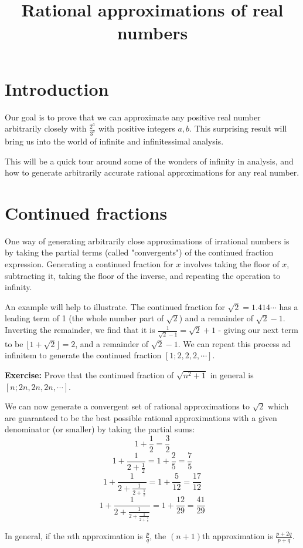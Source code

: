 \documentclass{article}
\begin{document}
\title{Rational approximations of real numbers}

\section{Introduction}

Our goal is to prove that we can approximate any positive real number arbitrarily closely
with $\frac{2^a}{3^b}$ with positive integers $a,b$. This surprising result will bring us
into the world of infinite and infinitessimal analysis.

This will be a quick tour around some of the wonders of infinity in analysis, and how to
generate arbitrarily accurate rational approximations for any real number.

\section{Continued fractions}

One way of generating arbitrarily close approximations of irrational numbers is by taking
the partial terms (called "convergents") of the continued fraction expression. Generating
a continued fraction for $x$ involves taking the floor of $x$, subtracting it, taking the
floor of the inverse, and repeating the operation to infinity.

An example will help to illustrate. The continued fraction for $\sqrt{2} = 1.414\cdots$ has
a leading term of 1 (the whole number part of $\sqrt{2}$) and a remainder of $\sqrt{2}-1$.
Inverting the remainder, we find that it is $\frac{1}{\sqrt{2}-1} = \sqrt{2}+1$ - giving
our next term to be $\lfloor 1+\sqrt{2}\rfloor = 2$, and a remainder of $\sqrt{2}-1$.
We can repeat this process ad infinitem to generate the continued fraction 
$\left[1;2,2,2,\cdots\right]$.

\textbf{Exercise:} Prove that the continued fraction of $\sqrt{n^2+1}$ in general is 
$\left[n;2n,2n,2n,\cdots\right]$.

We can now generate a convergent set of rational approximations to $\sqrt{2}$ which are
guaranteed to be the best possible rational approximations with a given denominator (or
smaller) by taking the partial sums:
\[ 1+\frac{1}{2} = \frac{3}{2}\]
\[ 1+\frac{1}{2+\frac{1}{2}} = 1+\frac{2}{5} = \frac{7}{5} \]
\[ 1+\frac{1}{2+\frac{1}{2+\frac{1}{2}}} = 1+\frac{5}{12} = \frac{17}{12} \]
\[ 1+\frac{1}{2+\frac{1}{2+\frac{1}{2 + \frac{1}{2}}}} = 1+\frac{12}{29} = \frac{41}{29} \]

In general, if the $n$th approximation is $\frac{p}{q}$, the $(n+1)$th approximation is 
$\frac{p+2q}{p+q}$.
\end{document}
